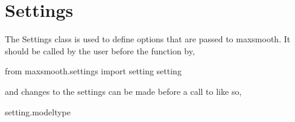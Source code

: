 \documentclass[letterpaper,10pt,english]{sphinxmanual}
\begin{document}
\section{Settings}
\label{\detokenize{source/maxsmooth:module-maxsmooth.settings}}\label{\detokenize{source/maxsmooth:settings}}
The Settings class is used to define options that are passed to maxsmooth.
It should be called by the user before the function  by,

\begin{sphinxVerbatim}[commandchars=\\\{\}]
from maxsmooth.settings import setting
  setting
\end{sphinxVerbatim}

and changes to the settings can be made before a call to 
like so,

\begin{sphinxVerbatim}[commandchars=\\\{\}]
setting.model\PYGZus{}type  
\end{sphinxVerbatim}
\end{document}

